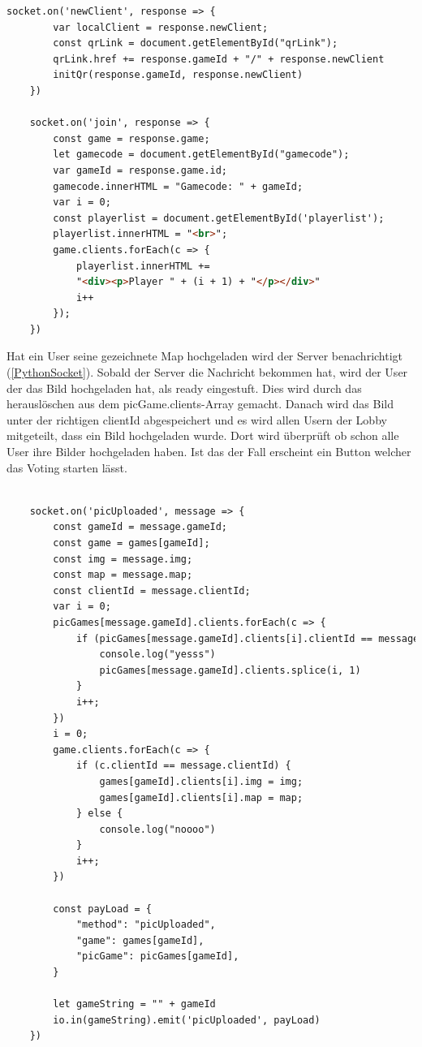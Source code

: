 \begin{lstlisting}[language=html,caption=Join Game Client ]
    socket.on('newClient', response => {
        var localClient = response.newClient;
        const qrLink = document.getElementById("qrLink");
        qrLink.href += response.gameId + "/" + response.newClient
        initQr(response.gameId, response.newClient)
    })

    socket.on('join', response => {
        const game = response.game;
        let gamecode = document.getElementById("gamecode");
        var gameId = response.game.id;
        gamecode.innerHTML = "Gamecode: " + gameId;
        var i = 0;
        const playerlist = document.getElementById('playerlist');
        playerlist.innerHTML = "<br>";
        game.clients.forEach(c => {
            playerlist.innerHTML +=
            "<div><p>Player " + (i + 1) + "</p></div>"
            i++
        });
    })
\end{lstlisting}


Hat ein User seine gezeichnete Map hochgeladen wird der Server benachrichtigt (\ref*{PythonSocket}).
Sobald der Server die Nachricht bekommen hat, wird der User der das Bild hochgeladen hat, als ready eingestuft. Dies wird durch das herauslöschen aus dem picGame.clients-Array gemacht.
Danach wird das Bild unter der richtigen clientId abgespeichert und es wird allen Usern der Lobby mitgeteilt, dass ein Bild hochgeladen wurde.
Dort wird überprüft ob schon alle User ihre Bilder hochgeladen haben. Ist das der Fall erscheint ein Button welcher das Voting starten lässt.
\begin{lstlisting}[language=html,caption=picUploaded Server]

    socket.on('picUploaded', message => {
        const gameId = message.gameId;
        const game = games[gameId];
        const img = message.img;
        const map = message.map;
        const clientId = message.clientId;
        var i = 0;
        picGames[message.gameId].clients.forEach(c => {
            if (picGames[message.gameId].clients[i].clientId == message.clientId) {
                console.log("yesss")
                picGames[message.gameId].clients.splice(i, 1)
            }
            i++;
        })
        i = 0;
        game.clients.forEach(c => {
            if (c.clientId == message.clientId) {
                games[gameId].clients[i].img = img;
                games[gameId].clients[i].map = map;
            } else {
                console.log("noooo")
            }
            i++;
        })

        const payLoad = {
            "method": "picUploaded",
            "game": games[gameId],
            "picGame": picGames[gameId],
        }

        let gameString = "" + gameId
        io.in(gameString).emit('picUploaded', payLoad)
    })
    
\end{lstlisting}

